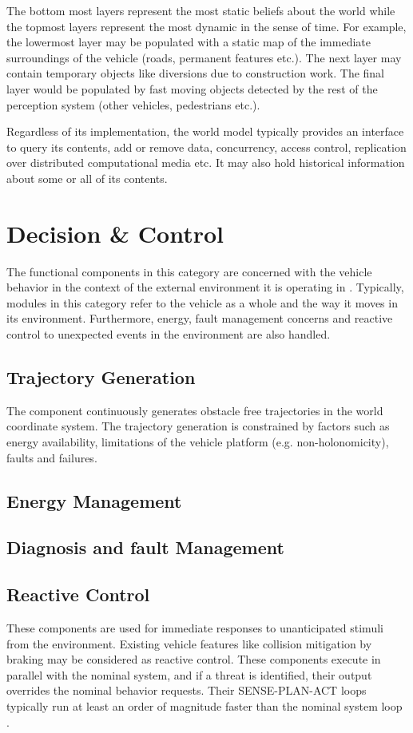 The bottom most layers represent the most static beliefs about the world while the topmost layers represent the most dynamic in the sense of time. For example, the lowermost layer may be populated with a static map of the immediate surroundings of the vehicle (roads, permanent features etc.). The next layer may contain temporary objects
like diversions due to construction work. The final layer would be populated by fast moving objects detected by the rest of the perception system (other vehicles, pedestrians etc.)\cite{ETSITR102}. 

Regardless of its implementation, the world model typically provides an interface to query its contents, add or remove data, concurrency, access control, replication over distributed computational media etc. It may also hold historical information about some or all of its contents.  


\section{Decision \& Control}
The functional components in this category are concerned with the vehicle behavior 
in the context of the external environment it is operating in \cite{Bahere}. Typically, modules in this category refer to the vehicle as a whole and the way it
moves in its environment. Furthermore, energy, fault management concerns and reactive control to unexpected events in the environment are also handled. 

\subsection{Trajectory Generation}
The component continuously generates obstacle free trajectories in the world coordinate system. The trajectory generation is constrained by factors such as energy availability, limitations of the vehicle platform (e.g. non-holonomicity), faults and failures. 

\subsection{Energy Management}

\subsection{Diagnosis and fault Management}

\subsection{Reactive Control}
These components are used for immediate responses to unanticipated stimuli from the environment. Existing vehicle features like collision mitigation  by braking may be considered as reactive control. These components execute in parallel with the nominal system, and if a threat is identified, their output overrides the nominal behavior requests. Their SENSE-PLAN-ACT loops typically run at least an order of magnitude faster than the  nominal system loop \cite{Bahere}.

